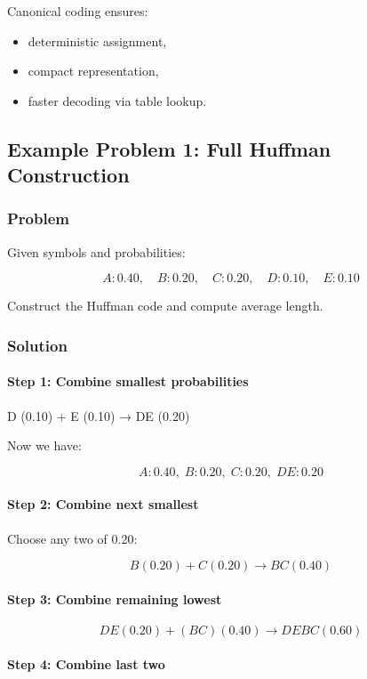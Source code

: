 \documentclass{AnantDocumentation}
\begin{document}
Canonical coding ensures:
\begin{itemize}
\item deterministic assignment,
\item compact representation,
\item faster decoding via table lookup.
\end{itemize}

\subsection{Example Problem 1: Full Huffman Construction}

\subsubsection*{Problem}

Given symbols and probabilities:

\[
A:0.40,\quad B:0.20,\quad C:0.20,\quad D:0.10,\quad E:0.10
\]

Construct the Huffman code and compute average length.

\subsubsection*{Solution}

\paragraph{Step 1: Combine smallest probabilities}

D (0.10) + E (0.10) → DE (0.20)

Now we have:

\[
A:0.40,\; B:0.20,\; C:0.20,\; DE:0.20
\]

\paragraph{Step 2: Combine next smallest}

Choose any two of 0.20:

\[
B(0.20) + C(0.20) \rightarrow BC(0.40)
\]

\paragraph{Step 3: Combine remaining lowest}

\[
DE(0.20) + (BC)(0.40) \rightarrow DEBC(0.60)
\]

\paragraph{Step 4: Combine last two}
\end{document}
